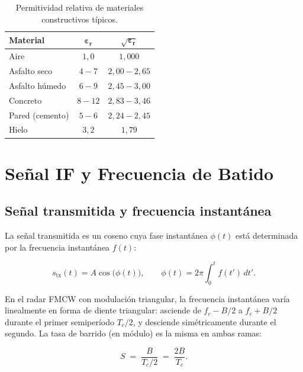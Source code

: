 \documentclass[12pt, a4paper, twoside]{report}
\begin{document}
\begin{table}[H]
  \centering
  \caption{Permitividad relativa de materiales constructivos típicos.}
  \label{tab:epsilon}
  \begin{tabular}{lcc}
    \toprule
    \textbf{Material}    & $\boldsymbol{\varepsilon_r}$ & $\boldsymbol{\sqrt{\varepsilon_r}}$ \\
    \midrule
    Aire                 & $1{,}0$       & $1{,}000$ \\
    Asfalto seco         & $4 - 7$       & $2{,}00 - 2{,}65$ \\
    Asfalto húmedo       & $6 - 9$       & $2{,}45 - 3{,}00$ \\
    Concreto             & $8 - 12$      & $2{,}83 - 3{,}46$ \\
    Pared (cemento)      & $5 - 6$       & $2{,}24 - 2{,}45$ \\
    Hielo                & $3{,}2$       & $1{,}79$ \\
    \bottomrule
  \end{tabular}
\end{table}

\chapter{Señal IF y Frecuencia de Batido}
\label{ch:senal_if}

\section{Señal transmitida y frecuencia instantánea}
\label{sec:fi_inst}

La señal transmitida es un coseno cuya fase instantánea $\phi(t)$
está determinada por la frecuencia instantánea $f(t)$:

\begin{equation}
  s_\text{tx}(t) = A\cos\!\bigl(\phi(t)\bigr),
  \qquad
  \phi(t) = 2\pi\int_0^t f(t')\,dt'.
  \label{eq:stx_general}
\end{equation}

En el radar FMCW con modulación triangular, la frecuencia
instantánea varía linealmente en forma de diente triangular: asciende
de $f_c - B/2$ a $f_c + B/2$ durante el primer semiperíodo
$T_c/2$, y desciende simétricamente durante el segundo. La tasa de
barrido (en módulo) es la misma en ambas ramas:

\begin{equation}
  S \;=\; \frac{B}{T_c/2} \;=\; \frac{2B}{T_c}.
  \label{eq:sweep_rate}
\end{equation}
\end{document}
